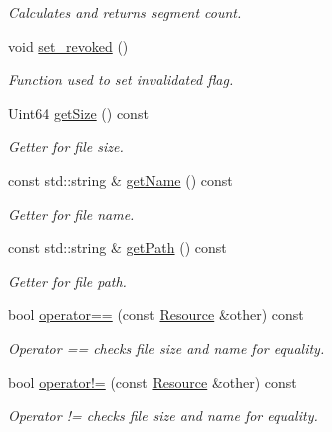 \begin{DoxyCompactItemize}
\begin{DoxyCompactList}\small\item\em Calculates and returns segment count. \end{DoxyCompactList}\item 
void \hyperlink{classsimpleP2P_1_1Resource_a49e46561e4088f78bb96c07c12d4738c}{set\+\_\+revoked} ()
\begin{DoxyCompactList}\small\item\em Function used to set invalidated flag. \end{DoxyCompactList}\item 
Uint64 \hyperlink{classsimpleP2P_1_1Resource_adadeb491cccabbce2e1d883f9e8519f7}{get\+Size} () const
\begin{DoxyCompactList}\small\item\em Getter for file size. \end{DoxyCompactList}\item 
const std\+::string \& \hyperlink{classsimpleP2P_1_1Resource_adc12496aedf1729852d2c98bf94428aa}{get\+Name} () const
\begin{DoxyCompactList}\small\item\em Getter for file name. \end{DoxyCompactList}\item 
const std\+::string \& \hyperlink{classsimpleP2P_1_1Resource_a866cdd2e717abf3515629ca73b2f80b8}{get\+Path} () const
\begin{DoxyCompactList}\small\item\em Getter for file path. \end{DoxyCompactList}\item 
bool \hyperlink{classsimpleP2P_1_1Resource_a0b42735bed5ab425b9e26b660ededecf}{operator==} (const \hyperlink{classsimpleP2P_1_1Resource}{Resource} \&other) const
\begin{DoxyCompactList}\small\item\em Operator == checks file size and name for equality. \end{DoxyCompactList}\item 
bool \hyperlink{classsimpleP2P_1_1Resource_a5694c4c5a3d5b303a1fa0dcb3fb478b1}{operator!=} (const \hyperlink{classsimpleP2P_1_1Resource}{Resource} \&other) const
\begin{DoxyCompactList}\small\item\em Operator != checks file size and name for equality. \end{DoxyCompactList}\end{DoxyCompactItemize}
